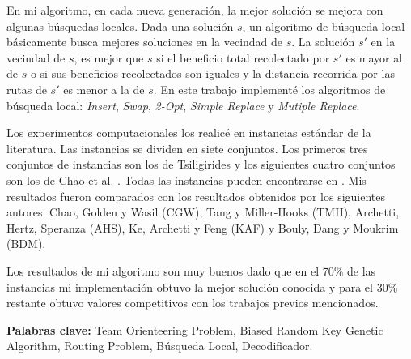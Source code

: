 \bigskip

En mi algoritmo, en cada nueva generación, la mejor solución se mejora con algunas búsquedas locales. Dada una solución $s$, un algoritmo de búsqueda local básicamente busca mejores soluciones en la vecindad de $s$. La solución $s'$ en la vecindad de $s$, es mejor que $s$ si el beneficio total recolectado por $s'$ es mayor al de $s$ o si sus beneficios recolectados son iguales y la distancia recorrida por las rutas de $s'$ es menor a la de $s$. En este trabajo implementé los algoritmos de búsqueda local: \textit{Insert}, \textit{Swap}, \textit{2-Opt}, \textit{Simple Replace} y \textit{Mutiple Replace}.

\bigskip

Los experimentos computacionales los realicé en instancias estándar de la literatura. Las instancias se dividen en siete conjuntos. Los primeros tres conjuntos de instancias son los de Tsiligirides \cite{Tsiligirides} y los siguientes cuatro conjuntos son los de Chao et al. \cite{ChaoGoldenWasil}. Todas las instancias pueden encontrarse en \cite{IntancesChaoTsiligirides}. Mis resultados fueron comparados con los resultados obtenidos por los siguientes autores: Chao, Golden y Wasil \cite{ChaoGoldenWasil} (CGW), Tang y Miller-Hooks \cite{TangMillerHooks} (TMH), Archetti, Hertz, Speranza \cite{ArchettiHertzSperanza} (AHS), Ke, Archetti y Feng \cite{KeArchettiFeng} (KAF) y Bouly, Dang y Moukrim \cite{BoulyDangMoukrim} (BDM). 

\bigskip

Los resultados de mi algoritmo son muy buenos dado que en el 70\% de las instancias mi implementación obtuvo la mejor solución conocida y para el 30\% restante obtuvo valores competitivos con los trabajos previos mencionados.

\bigskip

\noindent\textbf{Palabras clave:} Team Orienteering Problem, Biased Random Key Genetic Algorithm, Routing Problem, Búsqueda Local, Decodificador.